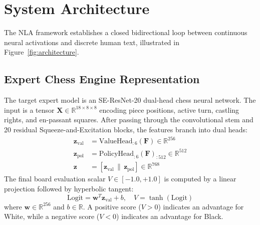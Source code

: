 \documentclass[10pt,twocolumn]{article}
\begin{document}
\section{System Architecture}

The NLA framework establishes a closed bidirectional loop between continuous neural activations and discrete human text, illustrated in Figure~\ref{fig:architecture}.

\subsection{Expert Chess Engine Representation}
The target expert model is an SE-ResNet-20 dual-head chess neural network. The input is a tensor $\mathbf{X} \in \mathbb{R}^{18 \times 8 \times 8}$ encoding piece positions, active turn, castling rights, and en-passant squares. After passing through the convolutional stem and 20 residual Squeeze-and-Excitation blocks, the features branch into dual heads:
\begin{align}
    \mathbf{z}_{\text{val}} &= \text{ValueHead}_{:6}(\mathbf{F}) \in \mathbb{R}^{256} \\
    \mathbf{z}_{\text{pol}} &= \text{PolicyHead}_{:6}(\mathbf{F})_{:512} \in \mathbb{R}^{512} \\
    \mathbf{z} &= [\mathbf{z}_{\text{val}} \,\|\, \mathbf{z}_{\text{pol}}] \in \mathbb{R}^{768}
\end{align}
The final board evaluation scalar $V \in [-1.0, +1.0]$ is computed by a linear projection followed by hyperbolic tangent:
\begin{equation}
    \text{Logit} = \mathbf{w}^T \mathbf{z}_{\text{val}} + b, \quad V = \tanh(\text{Logit})
\end{equation}
where $\mathbf{w} \in \mathbb{R}^{256}$ and $b \in \mathbb{R}$. A positive score ($V > 0$) indicates an advantage for White, while a negative score ($V < 0$) indicates an advantage for Black.
\end{document}
